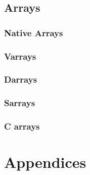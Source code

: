 \documentclass[oneside]{book}
\begin{document}
\chapter{Arrays}
\section{Native Arrays}
\section{Varrays}
\section{Darrays}
\section{Sarrays}
\section{C arrays}

\part{Appendices}
\appendix
\end{document}
